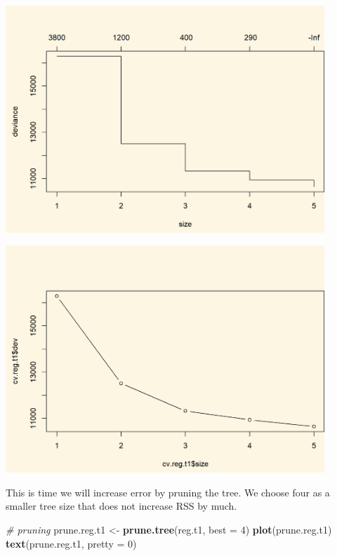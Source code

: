 \documentclass[]{article}
\newenvironment{Shaded}{\begin{snugshade}}{\end{snugshade}}
\newcommand{\CommentTok}[1]{\textcolor[rgb]{0.56,0.35,0.01}{\textit{#1}}}
\newcommand{\DataTypeTok}[1]{\textcolor[rgb]{0.13,0.29,0.53}{#1}}
\newcommand{\DecValTok}[1]{\textcolor[rgb]{0.00,0.00,0.81}{#1}}
\newcommand{\KeywordTok}[1]{\textcolor[rgb]{0.13,0.29,0.53}{\textbf{#1}}}
\newcommand{\NormalTok}[1]{#1}
\newcommand{\OperatorTok}[1]{\textcolor[rgb]{0.81,0.36,0.00}{\textbf{#1}}}
\newcommand{\StringTok}[1]{\textcolor[rgb]{0.31,0.60,0.02}{#1}}
\begin{document}
\includegraphics[width=0.9\textwidth,height=\textheight]{./img/unnamed-chunk-153-1.png}

\begin{Shaded}
\end{Shaded}

\includegraphics[width=0.9\textwidth,height=\textheight]{./img/unnamed-chunk-153-2.png}

This is time we will increase error by pruning the tree. We choose four as a smaller tree size that does not increase RSS by much.

\begin{Shaded}
\begin{Highlighting}[]
\CommentTok{# pruning}
\NormalTok{prune.reg.t1 <-}\StringTok{ }\KeywordTok{prune.tree}\NormalTok{(reg.t1, }\DataTypeTok{best =} \DecValTok{4}\NormalTok{)}
\KeywordTok{plot}\NormalTok{(prune.reg.t1)}
\KeywordTok{text}\NormalTok{(prune.reg.t1, }\DataTypeTok{pretty =} \DecValTok{0}\NormalTok{)}
\end{Highlighting}
\end{Shaded}
\end{document}
